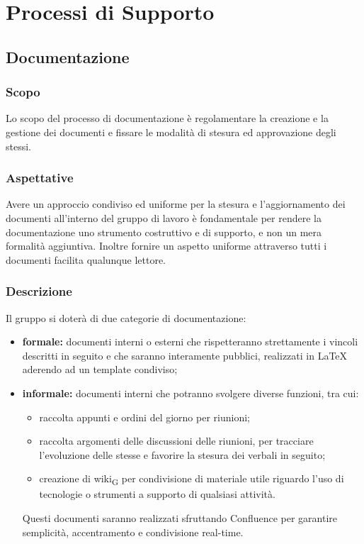 \section{Processi di Supporto}
\label{supporto}
\subsection{Documentazione}
    \subsubsection{Scopo}
    Lo scopo del processo di documentazione è regolamentare la creazione e la gestione dei documenti e fissare le modalità di stesura ed approvazione degli stessi.
    \subsubsection{Aspettative}
    Avere un approccio condiviso ed uniforme per la stesura e l'aggiornamento dei documenti all'interno del gruppo di lavoro è fondamentale per rendere la documentazione uno strumento costruttivo e di supporto, e non un mera formalità aggiuntiva.
    Inoltre fornire un aspetto uniforme attraverso tutti i documenti facilita qualunque lettore.
    \subsubsection{Descrizione}
    Il gruppo \group si doterà di due categorie di documentazione:
    \begin{itemize}
        \item \textbf{formale: }documenti interni o esterni che rispetteranno strettamente i vincoli descritti in seguito e che saranno interamente pubblici, realizzati in \LaTeX{} aderendo ad un template condiviso;
        \item \textbf{informale: }documenti interni che potranno svolgere diverse funzioni, tra cui:
        \begin{itemize}
            \item  raccolta appunti e ordini del giorno per riunioni;
            \item  raccolta argomenti delle discussioni delle riunioni, per tracciare l'evoluzione delle stesse e favorire la stesura dei verbali in seguito;
            \item  creazione di \gls{wiki}\textsubscript{G} per condivisione di materiale utile riguardo l'uso di tecnologie o strumenti a supporto di qualsiasi attività.
        \end{itemize}
        Questi documenti saranno realizzati sfruttando Confluence per garantire semplicità, accentramento e condivisione real-time.

    \end{itemize}
